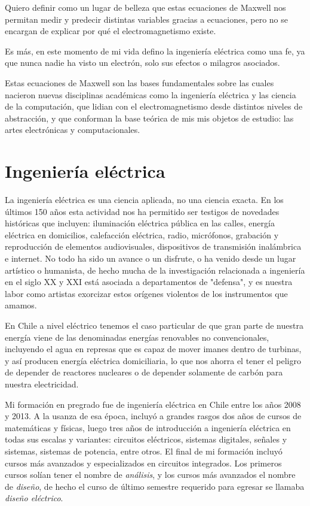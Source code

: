 \documentclass{article}
\begin{document}
Quiero definir como un lugar de belleza que estas ecuaciones de Maxwell nos permitan medir y predecir distintas variables gracias a ecuaciones, pero no se encargan de explicar por qué el electromagnetismo existe.

Es más, en este momento de mi vida defino la ingeniería eléctrica como una fe, ya que nunca nadie ha visto un electrón, solo sus efectos o milagros asociados.

Estas ecuaciones de Maxwell son las bases fundamentales sobre las cuales nacieron nuevas disciplinas académicas como la ingeniería eléctrica y las ciencia de la computación, que lidian con el electromagnetismo desde distintos niveles de abstracción, y que conforman la base teórica de mis mis objetos de estudio: las artes electrónicas y computacionales.

\clearpage

\section{Ingeniería eléctrica}

La ingeniería eléctrica es una ciencia aplicada, no una ciencia exacta. En los últimos 150 años esta actividad nos ha permitido ser testigos de novedades históricas que incluyen: iluminación eléctrica pública en las calles, energía eléctrica en domicilios, calefacción eléctrica, radio, micrófonos, grabación y reproducción de elementos audiovisuales, dispositivos de transmisión inalámbrica e internet. No todo ha sido un avance o un disfrute, o ha venido desde un lugar artístico o humanista, de hecho mucha de la investigación relacionada a ingeniería en el siglo XX y XXI está asociada a departamentos de "defensa", y es nuestra labor como artistas exorcizar estos orígenes violentos de los instrumentos que amamos.

En Chile a nivel eléctrico tenemos el caso particular de que gran parte de nuestra energía  viene de las denominadas energías renovables no convencionales, incluyendo el agua en represas que es capaz de mover imanes dentro de turbinas, y así producen energía eléctrica domiciliaria, lo que nos ahorra el tener el peligro de depender de reactores nucleares o de depender solamente de carbón para nuestra electricidad.

Mi formación en pregrado fue de ingeniería eléctrica en Chile entre los años 2008 y 2013. A la usanza de esa época, incluyó a grandes rasgos dos años de cursos de matemáticas y físicas, luego tres años de introducción a ingeniería eléctrica en todas sus escalas y variantes: circuitos eléctricos, sistemas digitales, señales y sistemas, sistemas de potencia, entre otros. El final de mi formación incluyó cursos más avanzados y especializados en circuitos integrados. Los primeros cursos solían tener el nombre de \textit{análisis}, y los cursos más avanzados el nombre de \textit{diseño}, de hecho el curso de último semestre requerido para egresar se llamaba \textit{diseño eléctrico}. 
\end{document}
